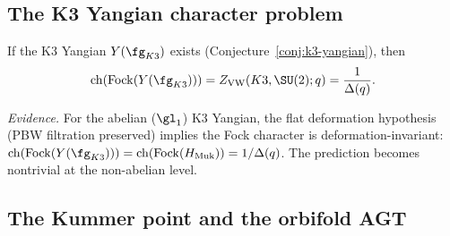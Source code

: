 \subsection{The K3 Yangian character problem}
\label{subsec:k3e-yangian-character-agt}

\begin{conjecture}[K3 Yangian character = VW partition function]
\label{conj:k3e-yangian-agt}
\ClaimStatusConjectured
If the K3 Yangian $Y(\fg_{K3})$ exists (Conjecture~\ref{conj:k3-yangian}), then
\[
 \mathrm{ch}(\mathrm{Fock}(Y(\fg_{K3})))
 = Z_{\mathrm{VW}}(K3, \SU(2); q)
 = \frac{1}{\Delta(q)}.
\]
\end{conjecture}

\noindent\emph{Evidence.} For the abelian ($\gl_1$) K3 Yangian, the flat deformation hypothesis (PBW filtration preserved) implies the Fock character is deformation-invariant: $\mathrm{ch}(\mathrm{Fock}(Y(\fg_{K3}))) = \mathrm{ch}(\mathrm{Fock}(H_{\mathrm{Muk}})) = 1/\Delta(q)$. The prediction becomes nontrivial at the non-abelian level.

\subsection{The Kummer point and the orbifold AGT}
\label{subsec:k3e-kummer-agt}

